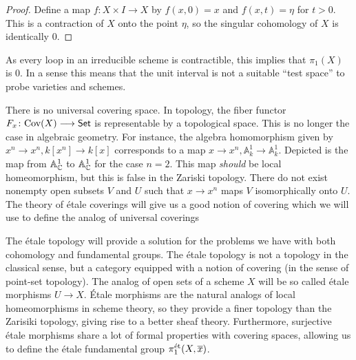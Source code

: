 \begin{proof}
	Define a map $f: X \times I \to X$  by $f(x,0) = x$ and $f(x,t) = \eta$ for $t > 0$. This is a contraction of $X$ onto the point $\eta$, so the singular cohomology of $X$ is identically 0.
\end{proof}

As every loop in an irreducible scheme is contractible, this implies that $\pi_1(X)$ is $0$. In a sense this means that the unit interval is not a suitable ``test space'' to probe varieties and schemes.

There is no universal covering space. In topology, the fiber functor $F_x \colon \text{Cov}(X) \longrightarrow \mathsf{Set}$ is representable by a topological space. This is no longer the case in algebraic geometry. For instance, the algebra homomorphism given by $x^n \to x^n, k[x^n] \to k[x]$ corresponds to a map $x \to x^n, \mathbb{A}^1_k \to \mathbb{A}^1_k$. Depicted is the map from $\mathbb{A}^1_{\mathbb{C}}$ to $\mathbb{A}^1_{\mathbb{C}}$ for the case $n=2$. This map \textit{should} be local homeomorphism, but this is false in the Zariski topology. There do not exist nonempty open subsets $V$ and $U$ such that $x \to x^n$ maps $V$ isomorphically onto $U$. The theory of \'etale coverings will give us a good notion of covering which we will use to define the analog of universal coverings

The \'etale topology will provide a solution for the problems we have with both cohomology and fundamental groups. The \'etale topology is not a topology in the classical sense, but a category equipped with a notion of covering (in the sense of point-set topology). The analog of open sets of a scheme $X$ will be so called \'etale morphisms $U \to X$. \'Etale morphisms are the natural analogs of local homeomorphisms in scheme theory, so they provide a finer topology than the Zarisiki topology, giving rise to a better sheaf theory. Furthermore, surjective \'etale morphisms share a lot of formal properties with covering spaces, allowing us to define the \'etale fundamental group $\pi_1^{\text{\'et}}(X, \overline{x})$.

